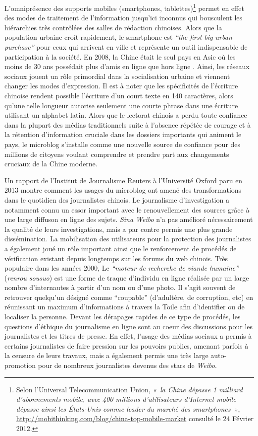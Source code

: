 L’omniprésence des supports mobiles (smartphones, tablettes)\footnote{Selon l’Universal Telecommunication Union, \textit{« la Chine dépasse 1 milliard d’abonnements mobile, avec 400 millions d’utilisateurs d’Internet mobile dépasse ainsi les États-Unis comme leader du marché des smartphones »}, \url{http://mobithinking.com/blog/china-top-mobile-market} consulté le 24 Février 2012.} permet en effet des modes de traitement de l’information jusqu’ici inconnus qui bousculent les hiérarchies très contrôlées des salles de rédaction chinoises. Alors que la population urbaine croît rapidement, le smartphone est \textit{“the first big urban purchase”} \citep{Wallis2013} pour ceux qui arrivent en ville et représente un outil indispensable de participation à la société. En 2008, la Chine était le seul pays en Asie où les moins de 30 ans possédait plus d’amis en ligne que hors ligne \citep{Hinckley2009}. Ainsi, les réseaux sociaux jouent un rôle primordial dans la socialisation urbaine et viennent changer les modes d’expression. Il est à noter que les spécificités de l’écriture chinoise rendent possible l’écriture d’un court texte en 140 caractères, alors qu’une telle longueur autorise seulement une courte phrase dans une écriture utilisant un alphabet latin. Alors que le lectorat chinois a perdu toute confiance dans la plupart des médias traditionnels suite à l’absence répétée de courage et à la rétention d’information cruciale dans les dossiers importants qui animent le pays, le microblog s’installe comme une nouvelle source de confiance pour des millions de citoyens voulant comprendre et prendre part aux changements cruciaux de la Chine moderne.

Un rapport de l’Institut de Journalisme Reuters à l’Université Oxford paru en 2013 montre comment les usages du microblog ont amené des transformations dans le quotidien des journalistes chinois. Le journalisme d’investigation a notamment connu un essor important avec le renouvellement des sources grâce à une large diffuson en ligne des sujets. \textit{Sina Weibo} n’a pas amélioré nécessairement la qualité de leurs investigations, mais a par contre permis une plus grande dissémination. La mobilisation des utilisateurs pour la protection des journalistes a également joué un rôle important ainsi que le renforcement de procédés de vérification existant depuis longtemps sur les forums du web chinois. Très populaire dans les années 2000, Le \textit{“moteur de recherche de viande humaine”} (\textit{renrou sousuo}) est une forme de traque d’individu en ligne réalisée par un large nombre d’internautes à partir d’un nom ou d’une photo. Il s’agit souvent de retrouver quelqu’un désigné comme “coupable” (d’adultère, de corruption, etc) en réunissant un maximum d’informations à travers la Toile afin d’identifier ou de localiser la personne. Devant les dérapages rapides de ce type de procédés, les questions d’éthique du journalisme en ligne sont au coeur des discussions pour les journalistes et les titres de presse. En effet, l’usage des médias sociaux a permis à certains journalistes de faire pression sur les pouvoirs publics, amenant parfois à la censure de leurs travaux, mais a également permis une très large auto-promotion pour de nombreux journalistes devenus des stars de \textit{Weibo}.

